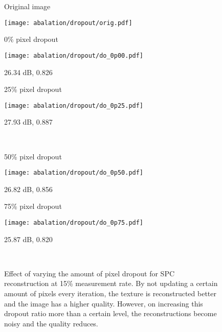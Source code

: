 \documentclass[journal,twoside]{IEEEtran}
\begin{document}
\begin{figure}[!h]
    \centering
\begin{minipage}{0.5\textwidth}
\centering
\begin{minipage}{.30\textwidth}
\centerline{Original image}
\vspace{0.01cm}
\texttt{[image: abalation/dropout/orig.pdf]}  
\centerline{}
\end{minipage}\hspace{0.1cm}
\begin{minipage}{.30\textwidth}
\centerline{0\% pixel dropout}
\vspace{0.1cm}
\texttt{[image: abalation/dropout/do\_0p00.pdf]}  
  
\centerline{ 26.34 dB, 0.826}
\end{minipage}\hspace{0.1cm}
\begin{minipage}{.30\textwidth}
\centerline{25\% pixel dropout}
\vspace{0.1cm}
\texttt{[image: abalation/dropout/do\_0p25.pdf]}

\centerline{ 27.93 dB, 0.887}
\end{minipage}\hspace{0.1cm}\\
\begin{minipage}{.30\textwidth}
\centerline{50\% pixel dropout}
\vspace{0.1cm}
\texttt{[image: abalation/dropout/do\_0p50.pdf]}  
  
\centerline{ 26.82 dB, 0.856}
\end{minipage}\hspace{0.1cm}
\begin{minipage}{.30\textwidth}
\centerline{75\% pixel dropout}
\vspace{0.1cm}
\texttt{[image: abalation/dropout/do\_0p75.pdf]}  
\centerline{ 25.87 dB, 0.820}

\end{minipage}\\

\end{minipage}
    \caption{Effect of varying the amount of pixel dropout for SPC reconstruction at 15\% measurement rate. By not updating a certain amount of pixels every iteration, the texture is reconstructed better and the image has a higher quality. However, on increasing this dropout ratio more than a certain level, the reconstructions become noisy and the quality reduces.}
    \label{fig:abalation_dropout}
\end{figure}
\end{document}
